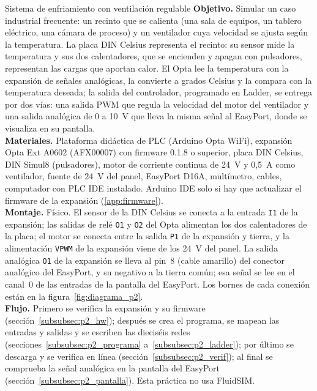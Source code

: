 \documentclass[12pt,a4paper]{article}
\begin{document}
\begin{practica}{Sistema de enfriamiento con ventilación regulable}
\textbf{Objetivo.} Simular un caso industrial frecuente: un recinto que
se calienta (una sala de equipos, un tablero eléctrico, una cámara de
proceso) y un ventilador cuya velocidad se ajusta según la temperatura. La
placa DIN Celsius representa el recinto: su sensor mide la temperatura y
sus dos calentadores, que se encienden y apagan con pulsadores, representan
las cargas que aportan calor. El Opta lee la temperatura con la expansión
de señales analógicas, la convierte a grados Celsius y la compara con la
temperatura deseada; la salida del controlador, programado en Ladder, se
entrega por dos vías: una salida PWM que regula la velocidad del motor del
ventilador y una salida analógica de 0 a 10~V que lleva la misma señal al
EasyPort, donde se visualiza en su pantalla.\\
\textbf{Materiales.} Plataforma didáctica de PLC (Arduino Opta WiFi),
expansión Opta Ext A0602 (AFX00007) con firmware 0.1.8 o superior, placa
DIN Celsius, DIN Simul8 (pulsadores), motor de corriente continua de 24~V
y 0,5~A como ventilador, fuente de 24~V del panel, EasyPort D16A,
multímetro, cables, computador con PLC IDE instalado. Arduino
IDE solo si hay que actualizar el firmware de la expansión
(\ref{app:firmware}).\\
\textbf{Montaje.} Físico. El sensor de la DIN Celsius se conecta a la
entrada \texttt{I1} de la expansión; las salidas de relé \texttt{O1} y
\texttt{O2} del Opta alimentan los dos calentadores de la placa; el motor
se conecta entre la salida \texttt{P1} de la expansión y tierra, y la
alimentación \texttt{VPWM} de la expansión viene de los 24~V del panel.
La salida analógica \texttt{O1} de la expansión se lleva al pin~8 (cable
amarillo) del conector analógico del EasyPort, y su negativo a la tierra
común; esa señal se lee en el canal~0 de las entradas de la pantalla del
EasyPort. Los bornes de cada conexión están en la
figura~\ref{fig:diagrama_p2}.\\
\textbf{Flujo.} Primero se verifica la expansión y su firmware
(sección~\ref{subsubsec:p2_hw}); después se crea el programa, se mapean
las entradas y salidas y se escriben las dieciséis redes
(secciones~\ref{subsubsec:p2_programa} a~\ref{subsubsec:p2_ladder}); por
último se descarga y se verifica en línea
(sección~\ref{subsubsec:p2_verif}); al final se comprueba la señal
analógica en la pantalla del EasyPort
(sección~\ref{subsubsec:p2_pantalla}). Esta práctica no usa FluidSIM.
\end{practica}
\end{document}
